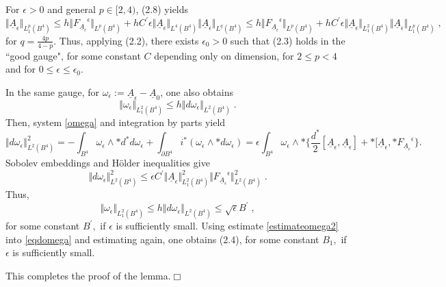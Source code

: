 \documentclass[11pt]{article}
\numberwithin{equation}{section} \setlength{\topmargin}{-35pt}
\begin{document}
\noindent
 For $\epsilon >0 $ and general $p\in [2, 4)$, (2.8) yields
$$\Vert {\underline  A}_\epsilon\Vert _{L^p_1(B^4)}\leq h\Vert{F_{\underline{A}_{\epsilon}}}^{\epsilon}\Vert_{L^p(B^4)} +
 hC^\prime\epsilon\Vert {\underline  A}_\epsilon\Vert_{L^4(B^4)}\Vert {\underline
 A}_\epsilon\Vert_{L^q(B^4)}\leq
 h\Vert{F_{\underline{A}_{\epsilon}}}^{\epsilon}\Vert_{L^p(B^4)} +
 hC^\prime\epsilon\Vert {\underline  A}_\epsilon\Vert_{L^2_1(B^4)}\Vert {\underline  A}_\epsilon\Vert_{L^p_1(B^4)}\;,$$
 for $q=\frac {4p}{4-p}.$
 Thus, applying (2.2), there exists $\epsilon_0>0$ such that (2.3)
 holds in the ``good gauge", for some constant $C$ depending only on dimension, for $2\leq
 p<4$ and for $0\leq\epsilon\leq\epsilon_0$.

 \noindent
 In the same gauge, for $\omega_\epsilon :=
 {\underline  A}_\epsilon - {\underline A}_0$, one also obtains
 \begin{equation}
 \label{estimateomega1}
 \Vert \omega_\epsilon\Vert _{L^2_1(B^4)}\leq h \Vert
 d\omega_\epsilon\Vert_{L^2(B^4)}\;.
 \end{equation}
Then,  system \eqref{omega} and integration by parts yield
\begin{equation}
\label{eqdomega}
 \Vert d\omega_\epsilon\Vert^2_{L^2(B^4)} =-\int_{B^4} \omega_\epsilon\wedge *
 d^*d\omega_\epsilon + \int_{\partial B^4} i^*(\omega_\epsilon\wedge *
 d\omega_\epsilon)= \epsilon \int_{B^4} \omega_\epsilon\wedge *
 \{ \frac{d^*}{2}[{\underline
A}_\epsilon, {\underline  A}_\epsilon]+* [{\underline  A}_\epsilon,
*{F_{\underline{A}_{\epsilon}}}^{\epsilon} \}.
\end{equation}
Sobolev embeddings and H\"older inequalities give
$$
 \Vert d\omega_\epsilon\Vert^2_{L^2(B^4)}\leq \epsilon C^\prime \Vert{\underline
 A}_\epsilon\Vert^2_{L^2_1(B^4)}\Vert{F_{\underline{A}_{\epsilon}}}^{\epsilon}\Vert^2_{L^2(B^4)} \;.$$
 Thus,
 \begin{equation}
\label{estimateomega2} \Vert \omega_\epsilon\Vert_{L^2_1(B^4)}\leq h
\Vert
 d\omega_\epsilon\Vert_{L^2(B^4)}\leq\sqrt\epsilon B^\prime\;,
 \end{equation}
 for some constant $B^\prime,$ if $\epsilon$ is sufficiently small.
 Using estimate \eqref{estimateomega2} into \eqref{eqdomega} and
 estimating again, one obtains (2.4),
for some constant $B_1,$ if $\epsilon$ is sufficiently small.

This completes the proof of the lemma.\hfill$\Box$

\medskip
\end{document}
